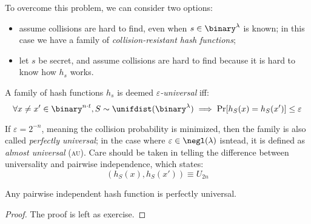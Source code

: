 To overcome this problem, we can consider two options:
\begin{itemize}
    \item assume collisions are hard to find, even when $s \in \binary^{\lambda}$ is known; in this case we have a family of \textit{collision-resistant hash functions};
    \item let $s$ be secret, and assume collisions are hard to find because it is hard to know how $h_s$ works.
\end{itemize}

\begin{definition}
    A family of hash functions $h_s$ is deemed \emph{$\varepsilon$-universal} iff:
    \[
        \forall x \neq x' \in \binary^{n \cdot t}, S \sim \unifdist(\binary^\lambda) \implies \Pr[h_S(x) = h_S(x')] \leq \varepsilon \qedhere
    \]
\end{definition}

If $\varepsilon = 2^{-n}$, meaning the collision probability is minimized, then the family is also called \emph{perfectly universal}; in the case where $\varepsilon \in \negl(\lambda)$ isntead, it is defined as \emph{almost universal} (\textsc{au}). Care should be taken in telling the difference between universality and pairwise independence, which states:
\[
    (h_S(x), h_S(x')) \equiv U_{2n}
\]

\begin{lemma}
    Any pairwise independent hash function is perfectly universal.
\end{lemma}

\begin{proof} The proof is left as exercise.
\end{proof}

